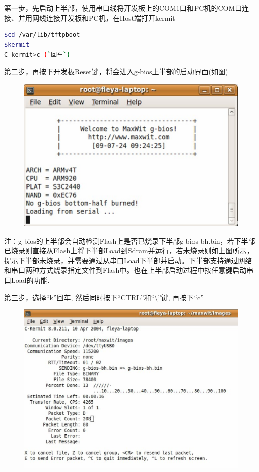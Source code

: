 \noindent{}第一步，先启动上半部，使用串口线将开发板上的COM1口和PC机的COM口连接、并用网线连接开发板和PC机，在Host端打开kermit\\
\begin{lstlisting}[language=bash,escapeinside=``]
$cd /var/lib/tftpboot
$kermit
C-kermit>c (`回车`)
\end{lstlisting}
\noindent{}第二步，再按下开发板Reset键，将会进入g-bios上半部的启动界面(如图)\\

\begin{figure}[t]
\centering
\includegraphics[width=5in]{image/step2.eps}
\end{figure}

\noindent{}注：g-bios的上半部会自动检测Flash上是否已烧录下半部g-bios-bh.bin，若下半部已烧录则直接从Flash上将下半部Load到Sdram并运行，若未烧录则如上图所示，提示下半部未烧录，并需要通过从串口Load下半部并启动。下半部支持通过网络和串口两种方式烧录指定文件到Flash中。也在上半部启动过程中按任意键启动串口Load的功能.

\noindent{}第三步，选择``k''回车, 然后同时按下``CTRL''和``\textbackslash''键, 再按下``c''\\

\begin{figure}[H]
\centering
\includegraphics[width=5in]{image/step3.eps}
\end{figure}

